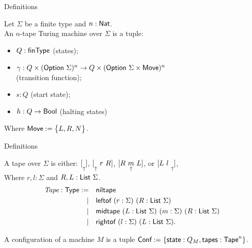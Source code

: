 \begin{frame}{Definitions}
  \begin{definition}
    Let $\Sigma$ be a finite type and $n:\textsf{Nat}$.
    \\
    An $n$-tape Turing machine over $\Sigma$ is a tuple:
    \begin{itemize}
      \item $Q : \textsf{finType}$ (states);
      \item $\gamma : Q \times (\textsf{Option}~\Sigma)^n \rightarrow Q \times (\textsf{Option}~\Sigma \times \textsf{Move})^n$
        \\ (transition function);
      \item $s:Q$ (start state);
      \item $h : Q \rightarrow \textsf{Bool}$ (halting states)
    \end{itemize}
    Where $\textsf{Move} := \bigl\{ L, R, N \bigr \}$.
  \end{definition}
\end{frame}

\begin{frame}{Definitions}
  \begin{definition}[Tape]
    A tape over $\Sigma$ is either:
    $ [ \underset{\uparrow}{} ]$, $[ \underset{\uparrow}{}~r~R ]$, $[ R~\underset{\uparrow}{m}~L ]$, or $[ L~l~\underset{\uparrow}{} ]$,\\
    Where $r,l : \Sigma$ and $R,L : \textsf{List}~\Sigma$.
    \pause
    \begin{alignat*}{2}
      \emph{Tape}:\textsf{Type} := \quad & \textsf{niltape} \\
      | \quad & \textsf{leftof}  ~ (r:\Sigma) ~ (R:\textsf{List}~\Sigma) \\
      | \quad & \textsf{midtape} ~ (L:\textsf{List}~\Sigma) ~ (m:\Sigma) ~ (R:\textsf{List}~\Sigma) \\
      | \quad & \textsf{rightof} ~ (l:\Sigma) ~ (L:\textsf{List}~\Sigma).
    \end{alignat*}
  \end{definition}
  \pause
  \begin{definition}[Configuration]
    A configuration of a machine $M$ is a tuple $\textsf{Conf} := \{\textsf{state}:Q_M, \textsf{tapes}:\textsf{Tape}^n\}$.
  \end{definition}
\end{frame}

